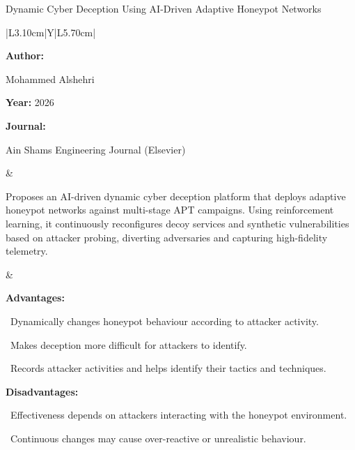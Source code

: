 \begin{frame}[t]{Dynamic Cyber Deception Using AI-Driven Adaptive Honeypot Networks}
\vspace{-0.30em}
{\footnotesize\setlength{\tabcolsep}{3.5pt}\renewcommand{\arraystretch}{1.10}
\begin{tabularx}{\textwidth}{|L{3.10cm}|Y|L{5.70cm}|}
\hline\lrhdr\hline
\begin{minipage}[t]{\linewidth}\fontsize{7.2pt}{9.2pt}\raggedright\selectfont
\textbf{Author:}\par
Mohammed Alshehri\par\vspace{4pt}
\textbf{Year:} 2026\par\vspace{4pt}
\textbf{Journal:}\par
Ain Shams Engineering Journal (Elsevier)\par\vspace{4pt}
\end{minipage}
&
\begin{minipage}[t]{\linewidth}\fontsize{7.2pt}{9.2pt}\raggedright\selectfont
Proposes an AI-driven dynamic cyber deception platform that deploys adaptive honeypot networks against multi-stage APT campaigns. Using reinforcement learning, it continuously reconfigures decoy services and synthetic vulnerabilities based on attacker probing, diverting adversaries and capturing high-fidelity telemetry.\par\vspace{4pt}
\end{minipage}
&
\begin{minipage}[t]{\linewidth}\fontsize{7.1pt}{8.8pt}\raggedright\selectfont
\textcolor{strengthGreen}{\textbf{Advantages:}}\par\vspace{1.3pt}
\textbullet~Dynamically changes honeypot behaviour according to attacker activity.\par\vspace{1.8pt}\textbullet~Makes deception more difficult for attackers to identify.\par\vspace{1.8pt}\textbullet~Records attacker activities and helps identify their tactics and techniques.\par\vspace{3.2pt}
\textcolor{limitRed}{\textbf{Disadvantages:}}\par\vspace{1.3pt}
\textbullet~Effectiveness depends on attackers interacting with the honeypot environment.\par\vspace{1.8pt}\textbullet~Continuous changes may cause over-reactive or unrealistic behaviour.\par\vspace{3pt}
\end{minipage} \\\hline
\end{tabularx}}
\end{frame}

